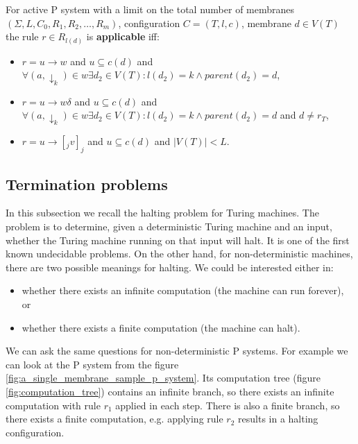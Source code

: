 \begin{definition}
  \label{def:applicable_rule_of_active_p_system_with_a_limit_on_total_number_of_membranes}
  For active P system with a limit on the total number of membranes $(\Sigma, L, C_0, R_1, R_2, \ldots , R_m)$, configuration $C = (T, l, c)$, membrane $d\in V(T)$ the rule $r\in R_{l(d)}$ is {\bf applicable} iff:
  \begin{itemize}
    \item $r = u\rightarrow w$ and $u\subseteq c(d)$ and $\forall (a,\downarrow_k)\in w \exists d_2\in V(T): l(d_2)=k \wedge parent(d_2) = d$,
    \item $r = u\rightarrow w\delta$ and $u\subseteq c(d)$ and $\forall (a,\downarrow_k)\in w \exists d_2\in V(T): l(d_2)=k \wedge parent(d_2) = d$ and $d\neq r_T$,
    \item $r = u\rightarrow [_j v]_j$ and $u\subseteq c(d)$ and $|V(T)|<L$.
  \end{itemize}
\end{definition}


\subsection{Termination problems} %
\label{sub:termination_problems}

In this subsection we recall the halting problem for Turing machines. The problem is to determine, given a deterministic Turing machine and an input, whether the Turing machine running on that input will halt. It is one of the first known undecidable problems. On the other hand, for non-deterministic machines, there are two possible meanings for halting. We could be interested either in:
\begin{itemize}
  \item whether there exists an infinite computation (the machine can run forever), or
  \item whether there exists a finite computation (the machine can halt).
\end{itemize}

We can ask the same questions for non-deterministic P systems.
For example we can look at the P system from the figure \ref{fig:a_single_membrane_sample_p_system}. Its computation tree (figure \ref{fig:computation_tree}) contains an infinite branch, so there exists an infinite computation with rule $r_1$ applied in each step. There is also a finite branch, so there exists a finite computation, e.g. applying rule $r_2$ results in a halting configuration.

